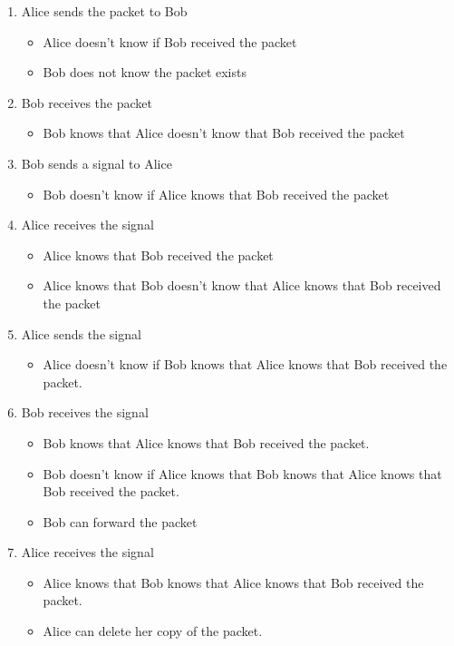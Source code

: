 \begin{enumerate}
\item Alice sends the packet to Bob
	\begin{itemize}
	\item Alice doesn’t know if Bob received the packet
	\item Bob does not know the packet exists
	\end{itemize}
\item Bob receives the packet
	\begin{itemize}
	\item Bob knows that Alice doesn’t know that Bob received the packet
	\end{itemize}
\item Bob sends a signal to Alice
	\begin{itemize}
	\item Bob doesn’t know if Alice knows that Bob received the packet
	\end{itemize}
\item Alice receives the signal
	\begin{itemize}
	\item Alice knows that Bob received the packet
	\item Alice knows that Bob doesn’t know that Alice knows that Bob received the
packet
	\end{itemize}
\item Alice sends the signal
	\begin{itemize}
	\item Alice doesn’t know if Bob knows that Alice knows that Bob received the
packet.
	\end{itemize}
\item Bob receives the signal
	\begin{itemize}
	\item Bob knows that Alice knows that Bob received the packet.
	\item Bob doesn’t know if Alice knows that Bob knows that Alice knows that Bob
received the packet.
	\item Bob can forward the packet
	\end{itemize}
\item Alice receives the signal
	\begin{itemize}
	\item Alice knows that Bob knows that Alice knows that Bob received the packet.
	\item Alice can delete her copy of the packet.
	\end{itemize}
\end{enumerate}

